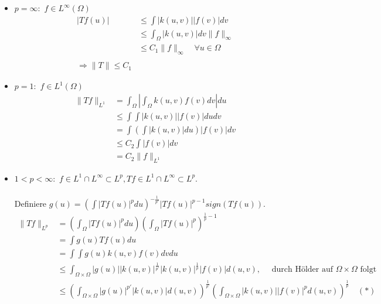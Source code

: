 \begin{beweis}
	\begin{itemize}
		\item $p = \infty:$ $f \in L^{\infty}(\Omega)$
			\begin{align*}
				|T f(u)| & \leq \int |k(u, v)| |f(v)| dv \\
						 & \leq \int_{\Omega} |k(u, v)| dv \|f\|_{\infty} \\
						 & \leq C_{1} \| f \|_{\infty} \quad \forall u \in \Omega \\ \\
				\Rightarrow \| T \| \leq C_{1}
			\end{align*}
			
		\item $p = 1:$  $f \in L^{1}(\Omega)$
			\begin{align*}
				\| T f \|_{L^{1}} & = \int_{\Omega} \left| \int_{\Omega} k(u, v) f(v) dv \right| du \\
				& \leq \int \int |k(u, v)| |f(v)| du dv \\
				& = \int \left( \int |k(u, v)| du \right) |f(v)| dv \\
				& \leq C_{2} \int |f(v)| dv \\
				& = C_{2} \| f \|_{L^{1}}
			\end{align*}
		\item $1 < p < \infty:$	$f \in L^{1} \cap L^{\infty} \subset L^{p}, T f \in L^{1} \cap L^{\infty} \subset L^{p}$. \\ \\
			Definiere $g(u) = \left( \int |Tf(u)|^{p} du \right)^{- \frac{1}{p'}} \left| T f(u) \right|^{p - 1} sign( T f(u) )$.
			\begin{align*}
				\| T f \|_{L^{p}} & = \left( \int_{\Omega} | T f(u) |^{p} du \right) \left( \int_{\Omega} | T f(u) |^{p} \right)^{\frac{1}{p} - 1} \\
								  & = \int g(u) Tf(u) du \\
								  & = \int \int g(u) k(u, v) f(v) dv du \\
								  & \leq \int_{\Omega \times \Omega} | g(u) | | k(u, v) |^{\frac{1}{p'}} |k(u, v) |^{\frac{1}{p}} |f(v)| d(u, v), \quad \text{ durch Hölder auf } \Omega \times \Omega \text{ folgt} \\
								  & \leq \left( \int_{\Omega \times \Omega} | g(u) |^{p'} |k(u, v)| d(u, v) \right)^{\frac{1}{p'}} \left( \int_{\Omega \times \Omega} |k(u, v)| |f(v)|^{p} d(u, v) \right)^{\frac{1}{p}} \quad (*)
			\end{align*}

\end{itemize}
\end{beweis}
